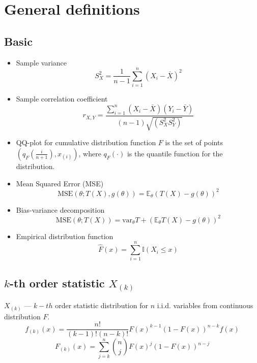 \documentclass[12pt]{article}
\newcommand{\II}{\mathbb{I}}
\begin{document}
\section{General definitions}

\subsection{Basic}

\begin{itemize}
\item
Sample variance
\begin{equation}
S_X^2 = \frac 1{n-1}\sum_{i = 1}^n(X_i - \bar X)^2
\end{equation}

\item
Sample correlation coefficient
\begin{equation}
r_{X,Y} = \frac{\sum_{i = 1}^{n}(X_i-\bar{X})(Y_i-\bar{Y})}{(n-1)\sqrt{(S_X^2S_Y^2)}}
\end{equation}

\item
QQ-plot for cumulative distribution function $F$ is the set of points $\left(q_F\left(\frac i {n+1}\right), x_{(i)}\right)$, where $q_F(\cdot)$ is the quantile function for the distribution.

\item Mean Squared Error (MSE)
\begin{equation}
	\text{MSE}(\theta; T(X), g(\theta)) = \mathbb{E}_\theta\left(T(X) - g(\theta)\right)^2
\end{equation}

\item
Bias-variance decomposition
\begin{equation}
\text{MSE}(\theta; T(X)) = \text{var}_\theta T + \left(\mathbb{E}_\theta T(X) - g(\theta)\right)^2
\end{equation}

\item\label{ecdf}
Empirical distribution function
\begin{equation}
	\hat{F}(x) = \sum_{i = 1}^n \II(X_i \leq x)
\end{equation}

\end{itemize}

\subsection {$k$-th order statistic $X_{(k)}$}
$X_{(k)}$ --- $k-th$ order statistic distribution for $n$ i.i.d. variables from continuous distribution $F$.
\begin{equation}\label{kth_order_pdf}
	f_{(k)}(x) = \frac{n!}{(k-1)!(n-k)!}F(x)^{k-1}(1-F(x))^{n-k}f(x)
\end{equation}
\begin{equation}\label{kth_order_cdf}
	F_{(k)}(x) = \sum_{j = k}^n {{n}\choose{j}}F(x)^j (1-F(x))^{n-j}
\end{equation}
\end{document}
